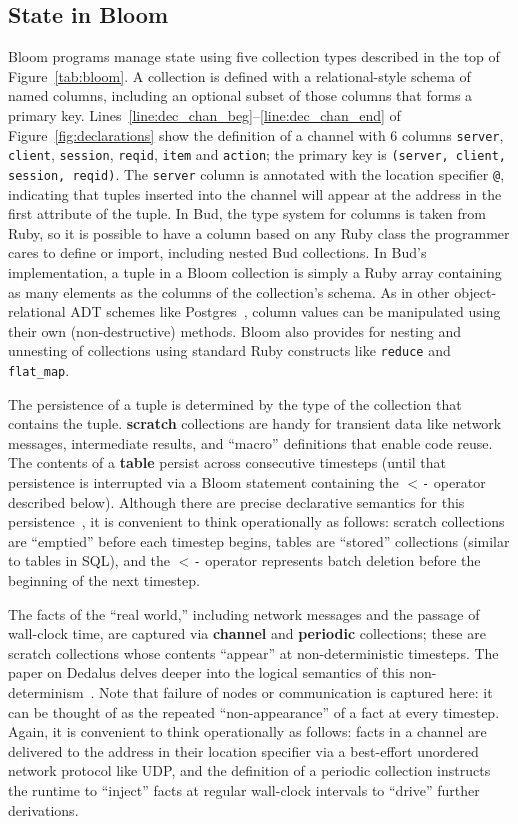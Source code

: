 \subsection{State in Bloom}
Bloom programs manage state using five collection types described in the top of
Figure~\ref{tab:bloom}. A collection is defined with a relational-style schema
of named columns, including an optional subset of those columns that forms a
primary key.  Lines~\ref{line:dec_chan_beg}--\ref{line:dec_chan_end} of
Figure~\ref{fig:declarations} show the definition of a channel with 6
columns \texttt{server}, \texttt{client}, \texttt{session}, \texttt{reqid},
\texttt{item} and \texttt{action}; the primary key is \texttt{(server, client,
  session, reqid)}. The \texttt{server} column is annotated with the location
specifier \texttt{@}, indicating that tuples inserted into the channel will
appear at the address in the first attribute of the tuple.  In Bud, the type
system for columns is taken from Ruby, so it is possible to have a column based
on any Ruby class the programmer cares to define or import, including nested Bud collections.  In Bud's implementation, a tuple in
a Bloom collection is simply a Ruby array containing as many elements as the
columns of the collection's schema.  As in other object-relational ADT schemes
like Postgres~\cite{postgres-adt}, column values can be manipulated using their
own (non-destructive) methods. Bloom also provides for nesting and unnesting of collections using standard Ruby constructs like \texttt{reduce} and  \texttt{flat\_map}.

The persistence of a tuple is determined by the type of the collection that
contains the tuple. \textbf{scratch} collections are handy for transient data
like network messages, intermediate results, and ``macro'' definitions that
enable code reuse. The contents of a \textbf{table} persist across consecutive
timesteps (until that persistence is interrupted via a Bloom statement
containing the \texttt{$<$-} operator described below). Although there are
precise declarative semantics for this persistence~\cite{dedalus}, it is
convenient to think operationally as follows: scratch collections are
``emptied'' before each timestep begins, tables are ``stored'' collections
(similar to tables in SQL), and the \texttt{$<$-} operator represents batch
deletion before the beginning of the next timestep.

The facts of the ``real world,'' including network messages and the passage of
wall-clock time, are captured via \textbf{channel} and \textbf{periodic}
collections; these are scratch collections whose contents ``appear'' at
non-deterministic timesteps.  The paper on Dedalus delves deeper into the
logical semantics of this non-determinism~\cite{dedalus}.  Note that failure of
nodes or communication is captured here: it can be thought of as the repeated
``non-appearance'' of a fact at every timestep.  Again, it is convenient to
think operationally as follows: facts in a channel are delivered to the
address in their location specifier via a best-effort unordered network protocol
like UDP, and the definition of a periodic collection instructs the
runtime to ``inject'' facts at regular wall-clock intervals to ``drive'' further
derivations.

